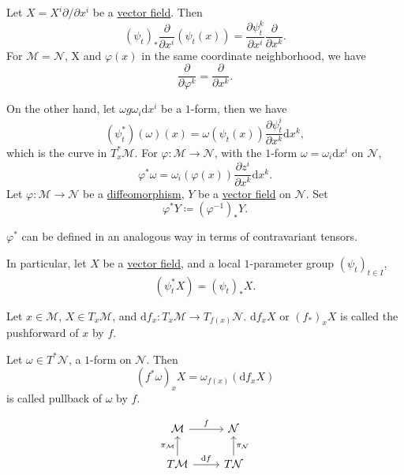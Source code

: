 Let \(X = X^i \partial /\partial x^i\) be a \hyperref[def:vector-field]{vector field}. Then
\[
	(\psi _t)_{\ast} \frac{\partial }{\partial x^i} (\psi _t(x))
	= \frac{\partial \psi _t^k}{\partial x^i} \frac{\partial }{\partial x^k}.
\]
For \(\mathcal{M} = \mathcal{N} \), X and \(\varphi (x)\) in the same coordinate neighborhood, we have
\[
	\frac{\partial }{\partial \varphi ^k} = \frac{\partial }{\partial x^k}.
\]

On the other hand, let \(\omega g \omega _i \mathrm{d} x^i\) be a \(1\)-form, then we have
\[
	(\psi ^{\ast} _t)(\omega )(x) = \omega (\psi _t(x))\frac{\partial \psi _t^i}{\partial x^k} \mathrm{d} x^k,
\]
which is the curve in \(T_x^{\ast} \mathcal{M} \). For \(\varphi \colon \mathcal{M} \to \mathcal{N} \), with the \(1\)-form \(\omega = \omega_i \mathrm{d} x^i\) on \(\mathcal{N} \),
\[
	\varphi ^{\ast} \omega = \omega _i (\varphi (x))\frac{\partial z^i}{\partial x^k} \mathrm{d} x^k.
\]
Let \(\varphi \colon \mathcal{M} \to \mathcal{N} \) be a \hyperref[def:diffeomorphism]{diffeomorphism}, \(Y\) be a \hyperref[def:vector-field]{vector field} on \(\mathcal{N} \). Set
\[
	\varphi ^{\ast} Y\coloneqq (\varphi ^{-1} )_\ast Y.
\]
\begin{remark}
	\(\varphi ^{\ast} \) can be defined in an analogous way in terms of contravariant tensors.
\end{remark}

In particular, let \(X\) be a \hyperref[def:vector-field]{vector field}, and a local \(1\)-parameter group \((\psi _t)_{t\in I}\),
\[
	(\psi _t ^{\ast} X)= (\psi _t)_\ast X.
\]

Let \(x\in \mathcal{M} \), \(X\in T_x \mathcal{M} \), and \(\mathrm{d} f_x \colon T_x \mathcal{M} \to T_{f(x)} \mathcal{N} \). \(\mathrm{d} f_x X\) or \((f_\ast)_x X\) is called the pushforward of \(x\) by \(f\).

Let \(\omega \in T^{\ast} \mathcal{N} \), a \(1\)-form on \(\mathcal{N} \). Then
\[
	(f^{\ast} \omega )_x X = \omega _{f(x)} (\mathrm{d} f_x X)
\]
is called pullback of \(\omega \) by \(f\).

\[
	\begin{tikzcd}
		{\mathcal{M}} & {\mathcal{N}} \\
		{T\mathcal{M}} & {T\mathcal{N}}
		\arrow["{\mathrm{d}f}", from=2-1, to=2-2]
		\arrow["f", from=1-1, to=1-2]
		\arrow["{\pi_{\mathcal{M}}}", from=2-1, to=1-1]
		\arrow["{\pi_\mathcal{N}}"', from=2-2, to=1-2]
	\end{tikzcd}
\]

